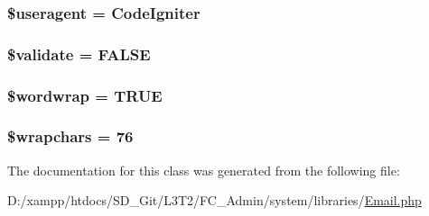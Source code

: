 \subsubsection[{\$useragent}]{\setlength{\rightskip}{0pt plus 5cm}\$useragent = \textquotesingle{}Code\+Igniter\textquotesingle{}}\label{class_c_i___email_adc6d59b7c0768eeffafe3b78c4836959}
\hypertarget{class_c_i___email_a320b75b46e1832c327d9d47b4cea9e7d}{}
\subsubsection[{\$validate}]{\setlength{\rightskip}{0pt plus 5cm}\$validate = F\+A\+L\+S\+E}\label{class_c_i___email_a320b75b46e1832c327d9d47b4cea9e7d}
\hypertarget{class_c_i___email_abc150a71df67310da874f7399ab5f2cd}{}
\subsubsection[{\$wordwrap}]{\setlength{\rightskip}{0pt plus 5cm}\$wordwrap = T\+R\+U\+E}\label{class_c_i___email_abc150a71df67310da874f7399ab5f2cd}
\hypertarget{class_c_i___email_a8834e27a87a8b935ab1155d1d7bd44d2}{}
\subsubsection[{\$wrapchars}]{\setlength{\rightskip}{0pt plus 5cm}\$wrapchars = 76}\label{class_c_i___email_a8834e27a87a8b935ab1155d1d7bd44d2}


The documentation for this class was generated from the following file\+:\begin{DoxyCompactItemize}
\item 
D\+:/xampp/htdocs/\+S\+D\+\_\+\+Git/\+L3\+T2/\+F\+C\+\_\+\+Admin/system/libraries/\hyperlink{_email_8php}{Email.\+php}\end{DoxyCompactItemize}
